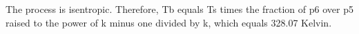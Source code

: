 The process is isentropic. Therefore, Tb equals Ts times the fraction of p6 over p5 raised to the power of k minus one divided by k, which equals 328.07 Kelvin.